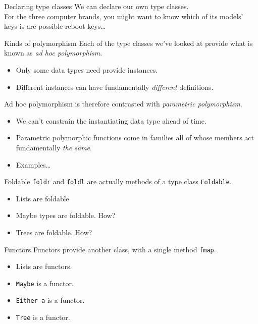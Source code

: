 \documentclass[presentation]{beamer}
\begin{document}
\begin{frame}[label={sec:org90fb092}]{Declaring type classes}
We can declare our own type classes. \\[0pt]
\pause \bigskip
For the three computer brands, you might want to know which of its models'
keys is are possible reboot keys\ldots{}
\end{frame}

\begin{frame}[label={sec:org25a5e06}]{Kinds of polymorphism}
\pause \bigskip
Each of the type classes we've looked at provide what is known as \emph{ad hoc
polymorphism}.
\pause
\begin{itemize}[<+->]
\item Only some data types need provide instances.
\item Different instances can have fundamentally \emph{different} definitions.
\end{itemize}
\pause
Ad hoc polymorphism is therefore contrasted with \emph{parametric polymorphism}.
\pause
\begin{itemize}[<+->]
\item We can't constrain the instantiating data type ahead of time.
\item Parametric polymorphic functions come in families all of whose members act
fundamentally \emph{the same}.
\item Examples\ldots{}
\end{itemize}
\end{frame}

\begin{frame}[label={sec:org0e50250},fragile]{Foldable}
 \texttt{foldr} and \texttt{foldl} are actually methods of a type class \texttt{Foldable}.
\pause
\begin{itemize}[<+->]
\item Lists are foldable
\item Maybe types are foldable. How?
\item Trees are foldable. How?
\end{itemize}
\end{frame}

\begin{frame}[label={sec:orgdcc1182},fragile]{Functors}
 Functors provide another class, with a single method \texttt{fmap}.
\pause
\begin{itemize}[<+->]
\item Lists are functors.
\item \texttt{Maybe} is a functor.
\item \texttt{Either a} is a functor.
\item \texttt{Tree} is a functor.
\end{itemize}
\end{frame}
\end{document}
